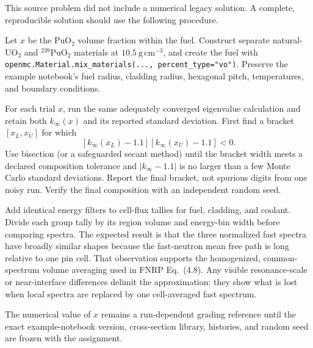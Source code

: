 \begin{draftsolution}
This source problem did not include a numerical legacy solution. A complete,
reproducible solution should use the following procedure.

Let $x$ be the PuO$_2$ volume fraction within the fuel. Construct separate
natural-UO$_2$ and ${}^{239}$PuO$_2$ materials at
$10.5~\mathrm{g\,cm^{-3}}$, and create the fuel with
\texttt{openmc.Material.mix\_materials(..., percent\_type="vo")}. Preserve
the example notebook's fuel radius, cladding radius, hexagonal pitch,
temperatures, and boundary conditions.

For each trial $x$, run the same adequately converged eigenvalue calculation
and retain both $k_\infty(x)$ and its reported standard deviation. First find
a bracket $[x_L,x_U]$ for which
\[
[k_\infty(x_L)-1.1][k_\infty(x_U)-1.1]<0.
\]
Use bisection (or a safeguarded secant method) until the bracket width meets a
declared composition tolerance and $|k_\infty-1.1|$ is no larger than a few
Monte Carlo standard deviations. Report the final bracket, not spurious
digits from one noisy run. Verify the final composition with an independent
random seed.

Add identical energy filters to cell-flux tallies for fuel, cladding, and
coolant. Divide each group tally by its region volume and energy-bin width
before comparing spectra. The expected result is that the three normalized
fast spectra have broadly similar shapes because the fast-neutron mean free
path is long relative to one pin cell. That observation supports the
homogenized, common-spectrum volume averaging used in FNRP Eq.~(4.8). Any
visible resonance-scale or near-interface differences delimit the
approximation: they show what is lost when local spectra are replaced by one
cell-averaged fast spectrum.

The numerical value of $x$ remains a run-dependent grading reference until
the exact example-notebook version, cross-section library, histories, and
random seed are frozen with the assignment.
\end{draftsolution}
